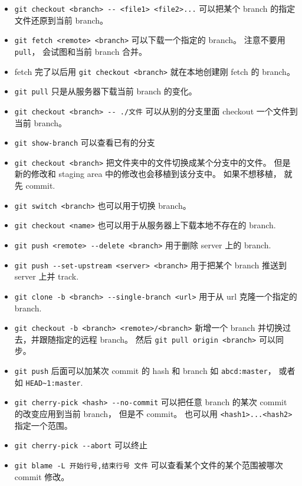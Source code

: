 \begin{itemize}
\item \verb`git checkout <branch> -- <file1> <file2>...` 可以把某个 branch 的指定文件还原到当前 branch。
\item \verb`git fetch <remote> <branch>` 可以下载一个指定的 branch。 注意不要用 \verb`pull`， 会试图和当前 branch 合并。
\item fetch 完了以后用 \verb`git checkout <branch>` 就在本地创建刚 fetch 的 branch。
\item \verb`git pull` 只是从服务器下载当前 branch 的变化。
\item \verb`git checkout <branch> -- ./文件` 可以从别的分支里面 checkout 一个文件到当前 branch。

\item \verb`git show-branch` 可以查看已有的分支 
\item \verb`git checkout <branch>` 把文件夹中的文件切换成某个分支中的文件。 但是新的修改和 staging area 中的修改也会移植到该分支中。 如果不想移植， 就先 commit.
\item \verb`git switch <branch>` 也可以用于切换 branch。
\item \verb`git checkout <name>` 也可以用于从服务器上下载本地不存在的 branch.
\item \verb`git push <remote> --delete <branch>` 用于删除 server 上的 branch.
\item \verb`git push --set-upstream <server> <branch>` 用于把某个 branch 推送到 server 上并 track.
\item \verb`git clone -b <branch> --single-branch <url>` 用于从 url 克隆一个指定的 branch.
\item \verb`git checkout -b <branch> <remote>/<branch>` 新增一个 branch 并切换过去，并跟随指定的远程 branch。 然后 \verb`git pull origin <branch>` 可以同步。
\item \verb`git push` 后面可以加某次 commit 的 hash 和 branch 如 \verb`abcd:master`， 或者如 \verb`HEAD~1:master`.
\item \verb`git cherry-pick <hash> --no-commit` 可以把任意 branch 的某次 commit 的改变应用到当前 branch， 但是不 commit。 也可以用 \verb`<hash1>...<hash2>` 指定一个范围。
\item \verb`git cherry-pick --abort` 可以终止
\item \verb`git blame -L 开始行号,结束行号 文件`  可以查看某个文件的某个范围被哪次 commit 修改。
\end{itemize}

